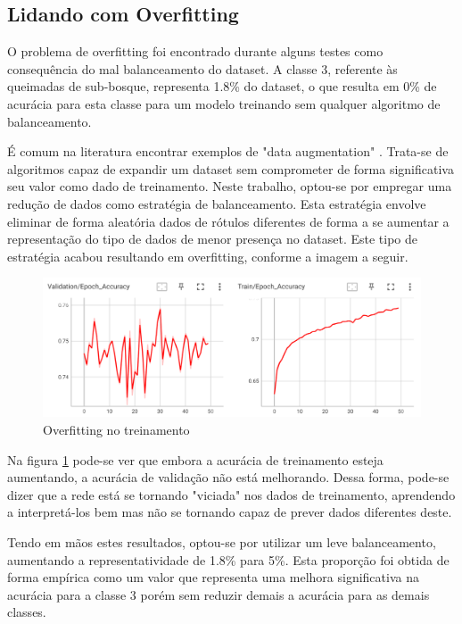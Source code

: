 \subsection{Lidando com Overfitting}
O problema de overfitting foi encontrado durante alguns testes como consequência do mal balanceamento do dataset. A classe 3, referente às queimadas de sub-bosque, representa 1.8\% do dataset, o que resulta em 0\% de acurácia para esta classe para um modelo treinando sem qualquer algoritmo de balanceamento.

É comum na literatura encontrar exemplos de "data augmentation" \cite{survey_data_augmentation}. Trata-se de algoritmos capaz de expandir um dataset sem comprometer de forma significativa seu valor como dado de treinamento. Neste trabalho, optou-se por empregar uma redução de dados como estratégia de balanceamento. Esta estratégia envolve eliminar de forma aleatória dados de rótulos diferentes de forma a se aumentar a representação do tipo de dados de menor presença no dataset. Este tipo de estratégia acabou resultando em overfitting, conforme a imagem a seguir.

\begin{figure}[ht]
    \centering
    \includegraphics[scale=0.5]{tg1/figuras/overfit.png}
    \caption{Overfitting no treinamento}
    \label{fig:overfitting}
\end{figure}

Na figura \ref{fig:overfitting} pode-se ver que embora a acurácia de treinamento esteja aumentando, a acurácia de validação não está melhorando. Dessa forma, pode-se dizer que a rede está se tornando "viciada" nos dados de treinamento, aprendendo a interpretá-los bem mas não se tornando capaz de prever dados diferentes deste.

Tendo em mãos estes resultados, optou-se por utilizar um leve balanceamento, aumentando a representatividade de 1.8\% para 5\%. Esta proporção foi obtida de forma empírica como um valor que representa uma melhora significativa na acurácia para a classe 3 porém sem reduzir demais a acurácia para as demais classes.



